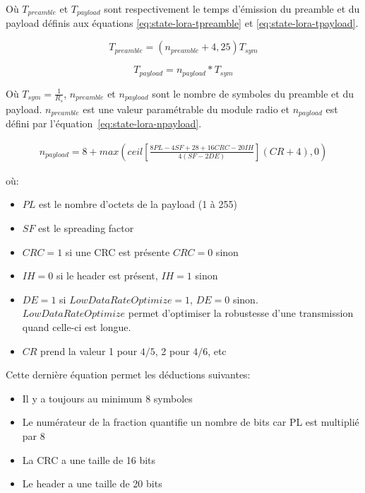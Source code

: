 Où $T_{preamble}$ et $T_{payload}$ sont respectivement le temps d'émission du preamble et du payload définis aux équations \ref{eq:state-lora-tpreamble} et \ref{eq:state-lora-tpayload}.

\begin{equation}\label{eq:state-lora-tpreamble}
    T_{preamble} = (n_{preamble} + 4,25)T_{sym}
\end{equation}

\begin{equation}\label{eq:state-lora-tpayload}
    T_{payload} = n_{payload} * T_{sym}
\end{equation}

Où $T_{sym} = \frac{1}{R_s}$, $n_{preamble}$ et $n_{payload}$ sont le nombre de symboles du preamble et du payload. $n_{preamble}$ est une valeur paramétrable du module radio et $n_{payload}$ est défini par l'équation~\ref{eq:state-lora-npayload}.

\begin{equation}\label{eq:state-lora-npayload}
    \begin{split}
    n_{payload} =8 +max
     \left( ceil \left[ \frac{8PL - 4SF + 28 + 16CRC - 20IH}{4(SF-2DE)} \right] (CR+4), 0 \right)
    \end{split}
\end{equation}

où:
\begin{itemize}
    \item $PL$ est le nombre d'octets de la payload (1 à 255)
    \item $SF$ est le spreading factor
    \item $CRC=1$ si une CRC est présente $CRC=0$ sinon
    \item $IH=0$ si le header est présent, $IH=1$ sinon
    \item $DE=1$ si $LowDataRateOptimize=1$, $DE=0$ sinon.\\
    $LowDataRateOptimize$ permet d'optimiser la robustesse d'une transmission quand celle-ci est longue.
    \item $CR$ prend la valeur 1 pour $4/5$, 2 pour $4/6$, etc
\end{itemize}
\vspace{0.5cm}
Cette dernière équation permet les déductions suivantes:
\begin{itemize}
    \item Il y a toujours au minimum 8 symboles
    \item Le numérateur de la fraction quantifie un nombre de bits car PL est multiplié par 8
    \item La CRC a une taille de 16 bits
    \item Le header a une taille de 20 bits
\end{itemize}